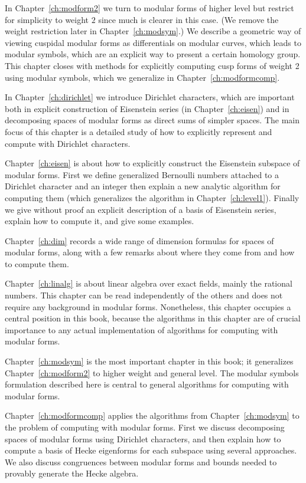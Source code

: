 In Chapter~\ref{ch:modform2} we turn to modular forms of higher level
but restrict for simplicity to weight $2$ since much is clearer in
this case.  (We remove the weight restriction later in
Chapter~\ref{ch:modsym}.)  We describe a geometric way of viewing
cuspidal modular forms as differentials on modular curves, which leads
to modular symbols, which are an explicit way to present a
certain homology group.  This chapter closes with methods for
explicitly computing cusp forms of weight 2 using modular symbols,
which we generalize in Chapter~\ref{ch:modformcomp}.

In Chapter~\ref{ch:dirichlet} we introduce Dirichlet characters, which
are important both in explicit construction of Eisenstein series (in 
Chapter~\ref{ch:eisen}) and
in decomposing spaces of modular forms as direct sums of simpler
spaces.  The main focus of this chapter is a detailed study of
how to explicitly represent and compute with Dirichlet characters.

Chapter~\ref{ch:eisen} is about how to explicitly construct the
Eisenstein subspace of modular forms.  First we define generalized
Bernoulli numbers attached to a Dirichlet character and an integer
then explain a new analytic algorithm for computing them (which
generalizes the algorithm in Chapter~\ref{ch:level1}).  Finally we
give without proof an explicit description of a basis of Eisenstein
series, explain how to compute it, and give some examples.

Chapter~\ref{ch:dim} records a wide range of dimension formulas for
spaces of modular forms, along with a few remarks about where they
come from and how to compute them.  

Chapter~\ref{ch:linalg} is about linear algebra over exact fields,
mainly the rational numbers.  This chapter can be read independently
of the others and does not require any background in modular forms.
Nonetheless, this chapter occupies a central position in this book,
because the algorithms in this chapter are of crucial importance to
any actual implementation of algorithms for computing with modular
forms.

Chapter~\ref{ch:modsym} is the most important chapter in this book; it
generalizes Chapter~\ref{ch:modform2} to higher weight and general
level.  The modular symbols formulation described here is central to
general algorithms for computing with modular forms.

Chapter~\ref{ch:modformcomp} applies the algorithms from
Chapter~\ref{ch:modsym} to the problem of computing with modular forms. First
we discuss decomposing spaces of modular forms using Dirichlet
characters, and then explain how to compute a basis of Hecke eigenforms
for each subspace using several approaches.  We also discuss
congruences between modular forms and bounds needed to provably
generate the Hecke algebra. 

